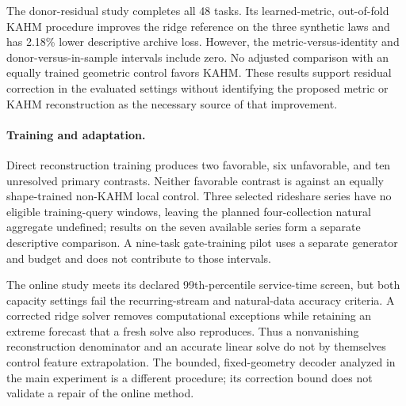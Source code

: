 The donor-residual study completes all 48 tasks. Its learned-metric,
out-of-fold KAHM procedure improves the ridge reference on the three
synthetic laws and has 2.18\% lower descriptive archive loss. However,
the metric-versus-identity and donor-versus-in-sample intervals include
zero. No adjusted comparison with an equally trained geometric control
favors KAHM. These results support residual correction in the evaluated
settings without identifying the proposed metric or KAHM reconstruction
as the necessary source of that improvement.

\paragraph{Training and adaptation.}
Direct reconstruction training produces two favorable, six unfavorable,
and ten unresolved primary contrasts. Neither favorable contrast is
against an equally shape-trained non-KAHM local control. Three selected
rideshare series have no eligible training-query windows, leaving the
planned four-collection natural aggregate undefined; results on the
seven available series form a separate descriptive comparison. A
nine-task gate-training pilot uses a separate generator and budget and
does not contribute to those intervals.

The online study meets its declared 99th-percentile service-time screen,
but both capacity settings fail the recurring-stream and natural-data
accuracy criteria. A corrected ridge solver removes computational
exceptions while retaining an extreme forecast that a fresh solve also
reproduces. Thus a nonvanishing reconstruction denominator and an accurate
linear solve do not by themselves control feature extrapolation. The
bounded, fixed-geometry decoder analyzed in the main experiment is a
different procedure; its correction bound does not validate a repair of
the online method.
